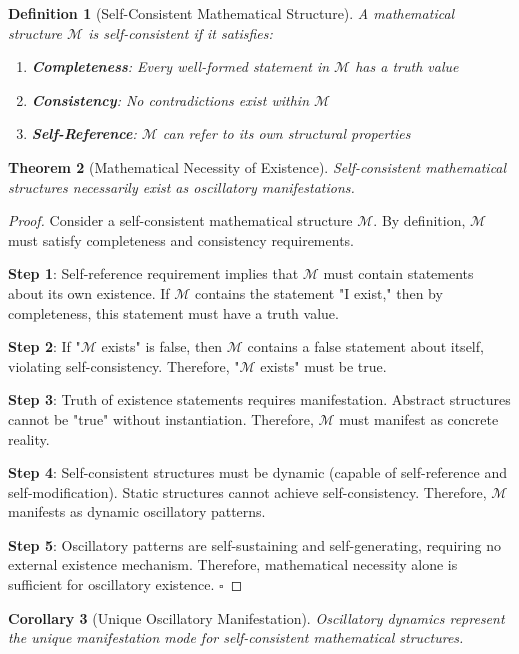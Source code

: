 \documentclass[11pt,a4paper]{article}
\newtheorem{theorem}{Theorem}[section]
\newtheorem{corollary}[theorem]{Corollary}
\newtheorem{definition}[theorem]{Definition}
\theoremstyle{remark}
\begin{document}
\begin{definition}[Self-Consistent Mathematical Structure]
A mathematical structure $\mathcal{M}$ is self-consistent if it satisfies:
\begin{enumerate}
\item \textbf{Completeness}: Every well-formed statement in $\mathcal{M}$ has a truth value
\item \textbf{Consistency}: No contradictions exist within $\mathcal{M}$
\item \textbf{Self-Reference}: $\mathcal{M}$ can refer to its own structural properties
\end{enumerate}
\end{definition}

\begin{theorem}[Mathematical Necessity of Existence]
Self-consistent mathematical structures necessarily exist as oscillatory manifestations.
\end{theorem}

\begin{proof}
Consider a self-consistent mathematical structure $\mathcal{M}$. By definition, $\mathcal{M}$ must satisfy completeness and consistency requirements.

\textbf{Step 1}: Self-reference requirement implies that $\mathcal{M}$ must contain statements about its own existence. If $\mathcal{M}$ contains the statement "I exist," then by completeness, this statement must have a truth value.

\textbf{Step 2}: If "$\mathcal{M}$ exists" is false, then $\mathcal{M}$ contains a false statement about itself, violating self-consistency. Therefore, "$\mathcal{M}$ exists" must be true.

\textbf{Step 3}: Truth of existence statements requires manifestation. Abstract structures cannot be "true" without instantiation. Therefore, $\mathcal{M}$ must manifest as concrete reality.

\textbf{Step 4}: Self-consistent structures must be dynamic (capable of self-reference and self-modification). Static structures cannot achieve self-consistency. Therefore, $\mathcal{M}$ manifests as dynamic oscillatory patterns.

\textbf{Step 5}: Oscillatory patterns are self-sustaining and self-generating, requiring no external existence mechanism. Therefore, mathematical necessity alone is sufficient for oscillatory existence. $\square$
\end{proof}

\begin{corollary}[Unique Oscillatory Manifestation]
Oscillatory dynamics represent the unique manifestation mode for self-consistent mathematical structures.
\end{corollary}
\end{document}
